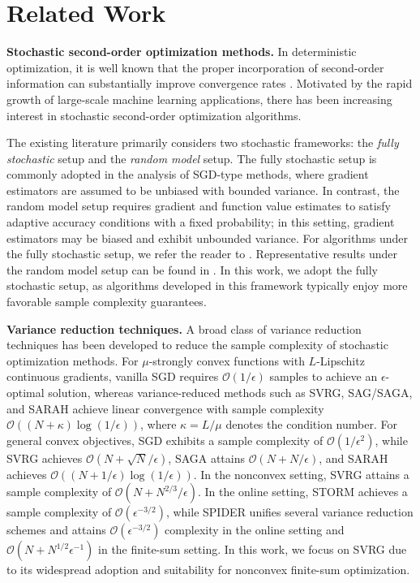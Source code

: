 \documentclass{article}
\theoremstyle{plain}
\theoremstyle{definition}
\theoremstyle{remark}
\begin{document}
\section{Related Work}\label{related_work}

\noindent\textbf{Stochastic second-order optimization methods.}
In deterministic optimization, it is well known that the proper incorporation of second-order information can substantially improve convergence rates \citep{Dennis1974characterization,Nocedal2006Numerical}. Motivated by the rapid growth of large-scale machine learning applications, there has been increasing interest in stochastic second-order optimization algorithms.

The existing literature primarily considers two stochastic frameworks: the \emph{fully stochastic} setup and the \emph{random model} setup. The fully stochastic setup is commonly adopted in the analysis of SGD-type methods, where gradient estimators are assumed to be unbiased with bounded variance. In contrast, the random model setup requires gradient and function value estimates to satisfy adaptive accuracy conditions with a fixed probability; in this setting, gradient estimators may be biased and exhibit unbounded variance. For algorithms under the fully stochastic setup, we refer the reader to \citep{Berahas2021Sequential,Fang2024Fully,Curtis2022Fully,Na2025Statistical,Kuang2025Online}. Representative results under the random model setup can be found in \citep{Blanchet2019Convergence,Fang2024Trust,Fang2025High,Na2022adaptive,Na2023Inequality}. In this work, we adopt the fully stochastic setup, as algorithms developed in this framework typically enjoy more favorable sample complexity guarantees.

\noindent\textbf{Variance reduction techniques.}
A broad class of variance reduction techniques has been developed to reduce the sample complexity of stochastic optimization methods. For $\mu$-strongly convex functions with $L$-Lipschitz continuous gradients, vanilla SGD requires $\mathcal{O}(1/\epsilon)$ samples to achieve an $\epsilon$-optimal solution, whereas variance-reduced methods such as SVRG, SAG/SAGA, and SARAH achieve linear convergence with sample complexity $\mathcal{O}((N + \kappa)\log(1/\epsilon))$, where $\kappa = L/\mu$ denotes the condition number. For general convex objectives, SGD exhibits a sample complexity of $\mathcal{O}(1/\epsilon^2)$, while SVRG achieves $\mathcal{O}(N + \sqrt{N}/\epsilon)$, SAGA attains $\mathcal{O}(N + N/\epsilon)$, and SARAH achieves $\mathcal{O}((N + 1/\epsilon)\log(1/\epsilon))$. In the nonconvex setting, SVRG attains a sample complexity of $\mathcal{O}(N + N^{2/3}/\epsilon)$. In the online setting, STORM achieves a sample complexity of $\mathcal{O}(\epsilon^{-3/2})$, while SPIDER unifies several variance reduction schemes and attains $\mathcal{O}(\epsilon^{-3/2})$ complexity in the online setting and $\mathcal{O}(N + N^{1/2}\epsilon^{-1})$ in the finite-sum setting. In this work, we focus on SVRG due to its widespread adoption and suitability for nonconvex finite-sum optimization.
\end{document}
